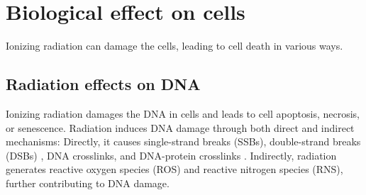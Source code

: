 





\section{Biological effect on cells}
Ionizing radiation can damage the cells, leading to cell death in various ways.

\subsection{Radiation effects on DNA}
Ionizing radiation damages the DNA \cite{Scholes2014} in cells and leads to cell apoptosis, necrosis, or senescence.
Radiation induces DNA damage through both direct and indirect mechanisms:
Directly, it causes single-strand breaks (SSBs), double-strand breaks (DSBs) \cite{Roots1985}, DNA crosslinks, and DNA-protein crosslinks \cite{Nakano2017}.
Indirectly, radiation generates reactive oxygen species (ROS) and reactive nitrogen species (RNS), further contributing to DNA damage.

